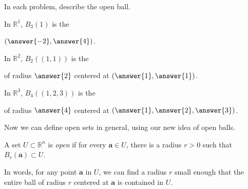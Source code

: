 \documentclass{ximera}
\begin{document}
In each problem, describe the open ball.

\begin{problem}
In $\mathbb{R}^1$, $B_3(1)$ is the \begin{multipleChoice}
\end{multipleChoice}  \begin{problem}$(\answer{-2},\answer{4})$.\end{problem}
\end{problem} 
 
 \begin{problem}
 In $\mathbb{R}^2$, $B_2((1,1))$ is the \begin{multipleChoice}
\end{multipleChoice} \begin{problem}of radius $\answer{2}$ centered at $(\answer{1}, \answer{1})$.\end{problem}
\end{problem}

\begin{problem}
In $\mathbb{R}^3$, $B_4((1,2,3))$ is the \begin{multipleChoice}
\end{multipleChoice} \begin{problem} of radius $\answer{4}$ centered at $(\answer{1}, \answer{2}, \answer{3})$.\end{problem}
\end{problem}


Now we can define open sets in general, using our new idea of open balls.

\begin{definition}
A set $U\subset \mathbb{R}^n$ is \emph{open} if for every $\mathbf{a}\in U$, there is a radius $r>0$ such that $B_r(\mathbf{a})\subset U$.
\end{definition}

In words, for any point $\mathbf{a}$ in $U$, we can find a radius $r$ small enough that the entire ball of radius $r$ centered at $\mathbf{a}$ is contained in $U$.

\begin{image}
\end{image}
\end{document}
